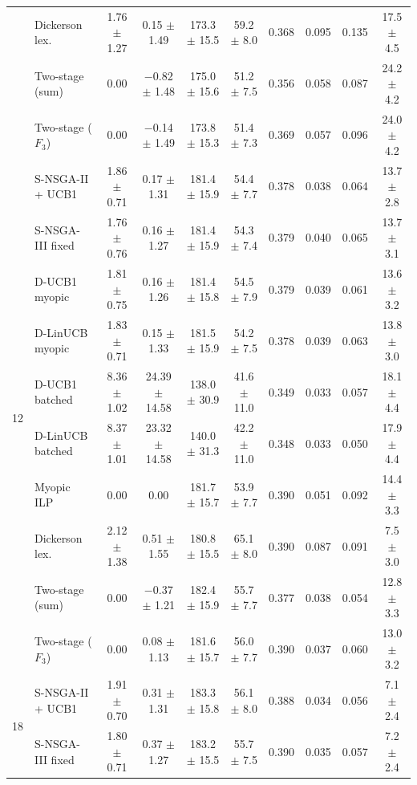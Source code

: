 \begin{table}[!t]
\begin{tabular}{@{}cl cccccccc@{}}
 & Dickerson lex.     & 1.76 $\pm$ 1.27 & 0.15 $\pm$ 1.49    & 173.3 $\pm$ 15.5 & 59.2 $\pm$ 8.0 & 0.368 & 0.095 & 0.135 & 17.5 $\pm$ 4.5 \\
 & Two-stage (sum)    & 0.00            & $-$0.82 $\pm$ 1.48 & 175.0 $\pm$ 15.6 & 51.2 $\pm$ 7.5 & 0.356 & 0.058 & 0.087 & 24.2 $\pm$ 4.2 \\
 & Two-stage ($F_3$)  & 0.00            & $-$0.14 $\pm$ 1.49 & 173.8 $\pm$ 15.3 & 51.4 $\pm$ 7.3 & 0.369 & 0.057 & 0.096 & 24.0 $\pm$ 4.2 \\
\midrule
\multirow{10}{*}{12}
 & S-NSGA-II + UCB1   & 1.86 $\pm$ 0.71 & 0.17 $\pm$ 1.31   & 181.4 $\pm$ 15.9 & 54.4 $\pm$ 7.7 & 0.378 & 0.038 & 0.064 & 13.7 $\pm$ 2.8 \\
 & S-NSGA-III fixed   & 1.76 $\pm$ 0.76 & 0.16 $\pm$ 1.27   & 181.4 $\pm$ 15.9 & 54.3 $\pm$ 7.4 & 0.379 & 0.040 & 0.065 & 13.7 $\pm$ 3.1 \\
 & D-UCB1 myopic      & 1.81 $\pm$ 0.75 & 0.16 $\pm$ 1.26   & 181.4 $\pm$ 15.8 & 54.5 $\pm$ 7.9 & 0.379 & 0.039 & 0.061 & 13.6 $\pm$ 3.2 \\
 & D-LinUCB myopic    & 1.83 $\pm$ 0.71 & 0.15 $\pm$ 1.33   & 181.5 $\pm$ 15.9 & 54.2 $\pm$ 7.5 & 0.378 & 0.039 & 0.063 & 13.8 $\pm$ 3.0 \\
 & D-UCB1 batched     & 8.36 $\pm$ 1.02 & 24.39 $\pm$ 14.58 & 138.0 $\pm$ 30.9 & 41.6 $\pm$ 11.0 & 0.349 & 0.033 & 0.057 & 18.1 $\pm$ 4.4 \\
 & D-LinUCB batched   & 8.37 $\pm$ 1.01 & 23.32 $\pm$ 14.58 & 140.0 $\pm$ 31.3 & 42.2 $\pm$ 11.0 & 0.348 & 0.033 & 0.050 & 17.9 $\pm$ 4.4 \\
 & Myopic ILP         & 0.00            & 0.00              & 181.7 $\pm$ 15.7 & 53.9 $\pm$ 7.7 & 0.390 & 0.051 & 0.092 & 14.4 $\pm$ 3.3 \\
 & Dickerson lex.     & 2.12 $\pm$ 1.38 & 0.51 $\pm$ 1.55   & 180.8 $\pm$ 15.5 & 65.1 $\pm$ 8.0 & 0.390 & 0.087 & 0.091 & 7.5 $\pm$ 3.0 \\
 & Two-stage (sum)    & 0.00            & $-$0.37 $\pm$ 1.21 & 182.4 $\pm$ 15.9 & 55.7 $\pm$ 7.7 & 0.377 & 0.038 & 0.054 & 12.8 $\pm$ 3.3 \\
 & Two-stage ($F_3$)  & 0.00            & 0.08 $\pm$ 1.13   & 181.6 $\pm$ 15.7 & 56.0 $\pm$ 7.7 & 0.390 & 0.037 & 0.060 & 13.0 $\pm$ 3.2 \\
\midrule
\multirow{10}{*}{18}
 & S-NSGA-II + UCB1   & 1.91 $\pm$ 0.70 & 0.31 $\pm$ 1.31   & 183.3 $\pm$ 15.8 & 56.1 $\pm$ 8.0 & 0.388 & 0.034 & 0.056 & 7.1 $\pm$ 2.4 \\
 & S-NSGA-III fixed   & 1.80 $\pm$ 0.71 & 0.37 $\pm$ 1.27   & 183.2 $\pm$ 15.5 & 55.7 $\pm$ 7.5 & 0.390 & 0.035 & 0.057 & 7.2 $\pm$ 2.4 \\

\end{tabular}
\end{table}
